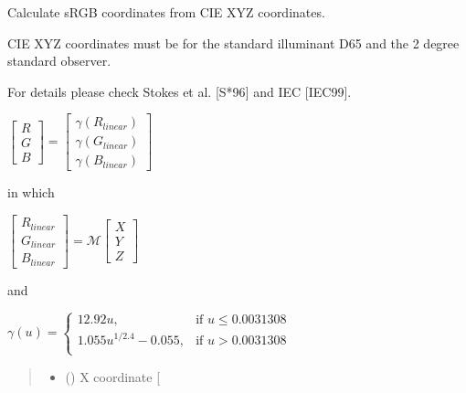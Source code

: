 \documentclass[letterpaper,10pt,english]{sphinxmanual}
\begin{document}
\begin{fulllineitems}
\label{\detokenize{07_colors:skinoptics.colors.sRGB_from_XYZ}}
\pysigstartsignatures
{}
\pysigstopsignatures
\begin{DUlineblock}{0em}
\item[] Calculate sRGB coordinates from CIE XYZ coordinates.
\item[] CIE XYZ coordinates must be for the standard illuminant D65 and the 2 degree standard observer.
\item[] For details please check Stokes et al. {[}S*96{]} and IEC {[}IEC99{]}.
\end{DUlineblock}

\sphinxAtStartPar
\(\begin{bmatrix}
R \\
G \\
B
\end{bmatrix}
=
\begin{bmatrix}
\gamma(R_{linear}) \\
\gamma(G_{linear}) \\
\gamma(B_{linear})
\end{bmatrix}\)

\sphinxAtStartPar
in which

\sphinxAtStartPar
\(\begin{bmatrix}
R_{linear} \\
G_{linear} \\
B_{linear}
\end{bmatrix}
=
\mathcal{M}
\begin{bmatrix}
X \\
Y \\
Z
\end{bmatrix}\)

\sphinxAtStartPar
and

\sphinxAtStartPar
\(\gamma(u) =  
\left \{ \begin{matrix}
12.92 u, & \mbox{if } u \le 0.0031308 \\
1.055 u^{1/2.4} - 0.055, & \mbox{if } u > 0.0031308 \\
\end{matrix} \right.\)
\begin{quote}\begin{description}
\begin{itemize}
\item {} 
\sphinxAtStartPar
{} () \textendash{} X coordinate {[}\sphinxhyphen{}{]}


\end{itemize}
\end{description}
\end{quote}
\end{fulllineitems}
\end{document}
